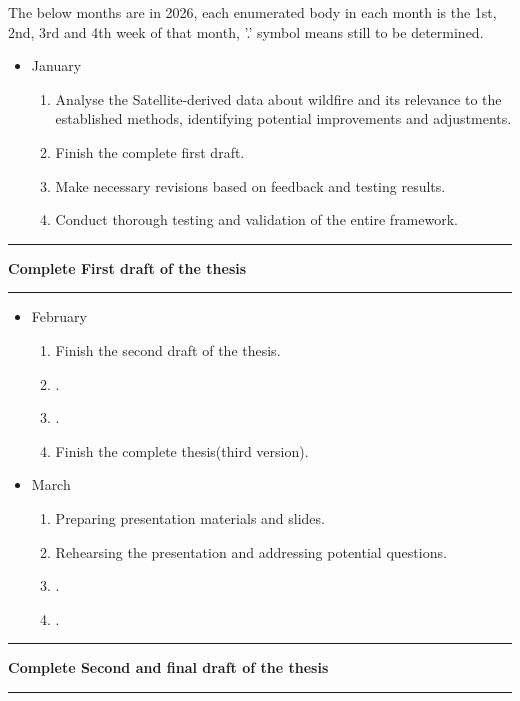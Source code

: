 The below months are in 2026, each enumerated body in each month is the 
1st, 2nd, 3rd and 4th week of that month, '.' symbol means still to be determined.

\begin{itemize}
    \item January
        \begin{enumerate}
            \item Analyse the Satellite-derived data about wildfire and its relevance to
            the established methods, identifying potential improvements and adjustments.
            \item Finish the complete first draft.
            \item Make necessary revisions based on feedback and testing results.
            \item Conduct thorough testing and validation of the entire framework.
        \end{enumerate}
\end{itemize}

\noindent\rule{\textwidth}{0.4pt}
\centerline{\textbf{Complete First draft of the thesis}}
\noindent\rule{\textwidth}{0.4pt}

\begin{itemize}
    \item February
        \begin{enumerate}
            \item Finish the second draft of the thesis.
            \item .
            \item .
            \item Finish the complete thesis(third version).
        \end{enumerate}

    \item March
        \begin{enumerate}
            \item Preparing presentation materials and slides.
            \item Rehearsing the presentation and addressing potential questions.
            \item .
            \item .
        \end{enumerate}
\end{itemize}

\noindent\rule{\textwidth}{0.4pt}
\centerline{\textbf{Complete Second and final draft of the thesis}}
\noindent\rule{\textwidth}{0.4pt}



